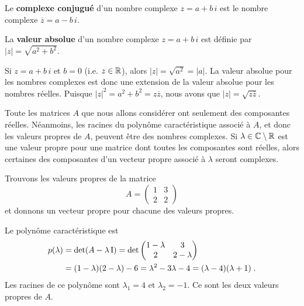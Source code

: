 {\begin{focus}{\dfn}
Le {\bfseries complexe conjugué} d'un
nombre complexe $z=a+b\,i$ est le nombre complexe
$\overline{z} = a - b\, i$.
\end{focus}

\begin{focus}{\dfn}
La {\bfseries valeur absolue}
d'un nombre complexe $z=a+b\,i$ est définie par
$|z| = \sqrt{a^2+b^2}$.
\end{focus}

Si $z = a + b \, i$ et $b=0$ (i.e. $z \in \mathbb{R}$), alors
$|z| = \sqrt{a^2} = |a|$.  La valeur absolue pour les nombres
complexes est donc une extension de la valeur absolue pour les nombres
réelles.  Puisque $|z|^2 = a^2 + b^2 = z\overline{z}$,
nous avons que $|z| = \sqrt{z\overline{z}}$.

\begin{rmk}
Toute les matrices $A$ que nous allons considérer ont seulement des
composantes réelles.  Néanmoins, les racines du polynôme
caractéristique associé à $A$, et donc les valeurs propres de $A$,
peuvent être des nombres complexes.  Si $\lambda \in \mathbb{C}\setminus \mathbb{R}$
est une valeur propre pour une matrice dont toutes les composantes
sont réelles, alors certaines des composantes d'un vecteur propre
associé à $\lambda$ seront complexes.
\end{rmk}

\begin{egg}
Trouvons les valeurs propres de la matrice
\[
A = \begin{pmatrix} 1 & 3 \\ 2 & 2 \end{pmatrix}
\]
et donnons un vecteur propre pour chacune des valeurs propres.

Le polynôme caractéristique est 
\begin{align*}
p(\lambda) &= \det(A - \lambda \operatorname{I}) = \det
\begin{pmatrix}
1-\lambda & 3 \\ 2 & 2-\lambda  
\end{pmatrix} \\
&= (1-\lambda)(2-\lambda) - 6 = \lambda^2 -3 \lambda - 4
= (\lambda - 4)(\lambda +1) \; .
\end{align*}
Les racines de ce polynôme sont $\lambda_1 = 4$ et $\lambda_2 = -1$.
Ce sont les deux valeurs propres de $A$.


\end{egg}}
